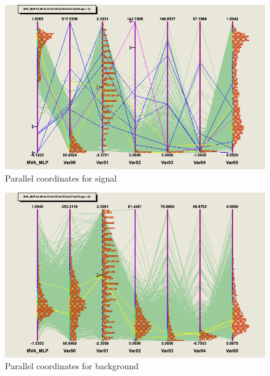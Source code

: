 \begin{figure}[h]
\begin{center}
\includegraphics[width=1.0\textwidth]{images/ahParacoor_c0_S.png}
\caption{Parallel coordinates for signal}
\label{fig:ahParacoor_c0_S}
\end{center}
\end{figure}
\begin{figure}[h]
\begin{center}
\includegraphics[width=1.0\textwidth]{images/ahParacoor_c0_B.png}
\caption{Parallel coordinates for background}
\label{fig:ahParacoor_c0_B}
\end{center}
\end{figure}



